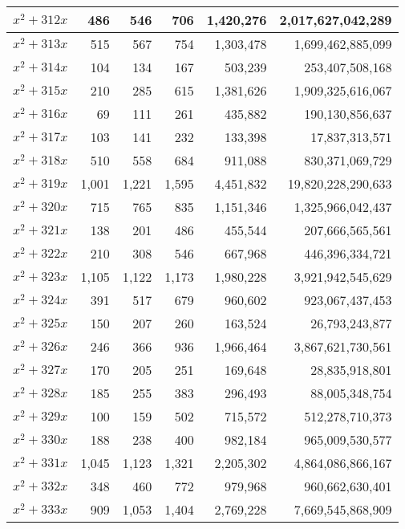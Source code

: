 \documentclass[a4paper]{amsproc}
\theoremstyle{plain}
\theoremstyle{named}
\begin{document}
\begin{longtable}{ | l | r | r | r | r | r | }
$x^2 + 312x$ & 486 & 546 & 706 & 1{,}420{,}276 & 2{,}017{,}627{,}042{,}289 \\ \hline
$x^2 + 313x$ & 515 & 567 & 754 & 1{,}303{,}478 & 1{,}699{,}462{,}885{,}099 \\ \hline
$x^2 + 314x$ & 104 & 134 & 167 & 503{,}239 & 253{,}407{,}508{,}168 \\ \hline
$x^2 + 315x$ & 210 & 285 & 615 & 1{,}381{,}626 & 1{,}909{,}325{,}616{,}067 \\ \hline
$x^2 + 316x$ & 69 & 111 & 261 & 435{,}882 & 190{,}130{,}856{,}637 \\ \hline
$x^2 + 317x$ & 103 & 141 & 232 & 133{,}398 & 17{,}837{,}313{,}571 \\ \hline
$x^2 + 318x$ & 510 & 558 & 684 & 911{,}088 & 830{,}371{,}069{,}729 \\ \hline
$x^2 + 319x$ & 1{,}001 & 1{,}221 & 1{,}595 & 4{,}451{,}832 & 19{,}820{,}228{,}290{,}633 \\ \hline
$x^2 + 320x$ & 715 & 765 & 835 & 1{,}151{,}346 & 1{,}325{,}966{,}042{,}437 \\ \hline
$x^2 + 321x$ & 138 & 201 & 486 & 455{,}544 & 207{,}666{,}565{,}561 \\ \hline
$x^2 + 322x$ & 210 & 308 & 546 & 667{,}968 & 446{,}396{,}334{,}721 \\ \hline
$x^2 + 323x$ & 1{,}105 & 1{,}122 & 1{,}173 & 1{,}980{,}228 & 3{,}921{,}942{,}545{,}629 \\ \hline
$x^2 + 324x$ & 391 & 517 & 679 & 960{,}602 & 923{,}067{,}437{,}453 \\ \hline
$x^2 + 325x$ & 150 & 207 & 260 & 163{,}524 & 26{,}793{,}243{,}877 \\ \hline
$x^2 + 326x$ & 246 & 366 & 936 & 1{,}966{,}464 & 3{,}867{,}621{,}730{,}561 \\ \hline
$x^2 + 327x$ & 170 & 205 & 251 & 169{,}648 & 28{,}835{,}918{,}801 \\ \hline
$x^2 + 328x$ & 185 & 255 & 383 & 296{,}493 & 88{,}005{,}348{,}754 \\ \hline
$x^2 + 329x$ & 100 & 159 & 502 & 715{,}572 & 512{,}278{,}710{,}373 \\ \hline
$x^2 + 330x$ & 188 & 238 & 400 & 982{,}184 & 965{,}009{,}530{,}577 \\ \hline
$x^2 + 331x$ & 1{,}045 & 1{,}123 & 1{,}321 & 2{,}205{,}302 & 4{,}864{,}086{,}866{,}167 \\ \hline
$x^2 + 332x$ & 348 & 460 & 772 & 979{,}968 & 960{,}662{,}630{,}401 \\ \hline
$x^2 + 333x$ & 909 & 1{,}053 & 1{,}404 & 2{,}769{,}228 & 7{,}669{,}545{,}868{,}909 \\ \hline

\end{longtable}
\end{document}
